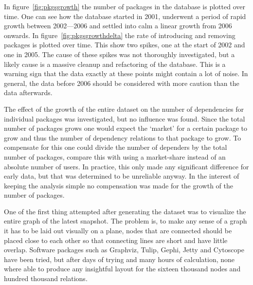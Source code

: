 \documentclass[smallextended,final]{svjour3}
\begin{document}
In figure~\ref{fig:pkgsgrowth} the number of packages in the database is plotted over time. One can see how the database started in 2001, underwent a period of rapid growth between 2002---2006 and settled into calm a linear growth from 2006 onwards. In figure~\ref{fig:pkgsgrowthdelta} the rate of introducing and removing packages is plotted over time. This show two spikes, one at the start of 2002 and one in 2005. The cause of these spikes was not thoroughly investigated, but a likely cause is a massive cleanup and refactoring of the database. This is a warning sign that the data exactly at these points might contain a lot of noise. In general, the data before 2006 should be considered with more caution than the data afterwards.

The effect of the growth of the entire dataset on the number of dependencies for individual packages was investigated, but no influence was found. Since the total number of packages grows one would expect the `market' for a certain package to grow and thus the number of dependency relations to that package to grow. To compensate for this one could divide the number of dependers by the total number of packages, compare this with using a market-share instead of an absolute number of users. In practice, this only made any significant difference for early data, but that was determined to be unreliable anyway. In the interest of keeping the analysis simple no compensation was made for the growth of the number of packages.

One of the first thing attempted after generating the dataset was to visualize the entire graph of the latest snapshot. The problem is, to make any sense of a graph it has to be laid out visually on a plane, nodes that are connected should be placed close to each other so that connecting lines are short and have little overlap. Software packages such as Graphviz, Tulip, Gephi, Jetty and Cytoscope have been tried, but after days of trying and many hours of calculation, none where able to produce any insightful layout for the sixteen thousand nodes and hundred thousand relations.
\end{document}
